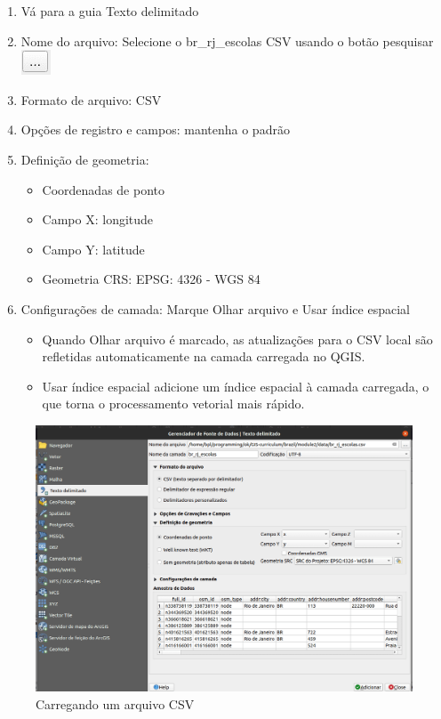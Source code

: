 \documentclass[
]{krantz}
\providecommand{\tightlist}{%
  \setlength{\itemsep}{0pt}\setlength{\parskip}{0pt}}
\begin{document}
\begin{enumerate}
\begin{enumerate}
    \begin{enumerate}
    \def\labelenumiii{\arabic{enumiii}.}
    \item
      Vá para a guia Texto delimitado
    \item
      Nome do arquivo: Selecione o br\_rj\_escolas CSV usando o botão pesquisar \includegraphics{media/modulo2/data-source-manager-search.png}
    \item
      Formato de arquivo: CSV
    \item
      Opções de registro e campos: mantenha o padrão
    \item
      Definição de geometria:

      \begin{itemize}
      \tightlist
      \item
        Coordenadas de ponto
      \item
        Campo X: longitude
      \item
        Campo Y: latitude
      \item
        Geometria CRS: EPSG: 4326 - WGS 84
      \end{itemize}
    \item
      Configurações de camada: Marque Olhar arquivo e Usar índice espacial

      \begin{itemize}
      \tightlist
      \item
        Quando Olhar arquivo é marcado, as atualizações para o CSV local são refletidas automaticamente na camada carregada no QGIS.
      \item
        Usar índice espacial adicione um índice espacial à camada carregada, o que torna o processamento vetorial mais rápido.
      \end{itemize}
    \end{enumerate}
  \end{enumerate}
\end{enumerate}

\begin{figure}
\centering
\includegraphics{media/modulo2/data-source-manager-csv.png}
\caption{Carregando um arquivo CSV}
\end{figure}
\end{document}
